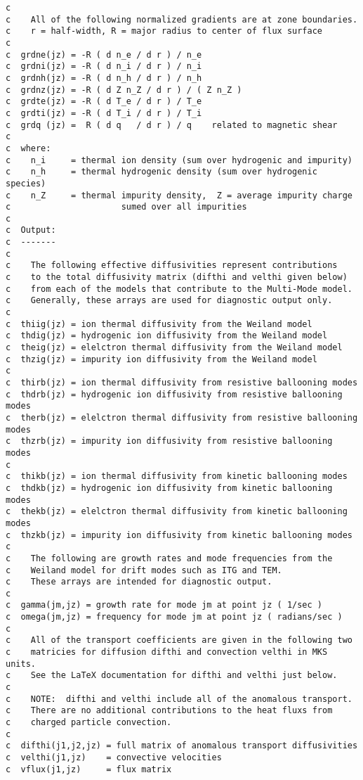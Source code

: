 \begin{verbatim}
c
c    All of the following normalized gradients are at zone boundaries.
c    r = half-width, R = major radius to center of flux surface
c
c  grdne(jz) = -R ( d n_e / d r ) / n_e
c  grdni(jz) = -R ( d n_i / d r ) / n_i
c  grdnh(jz) = -R ( d n_h / d r ) / n_h
c  grdnz(jz) = -R ( d Z n_Z / d r ) / ( Z n_Z )
c  grdte(jz) = -R ( d T_e / d r ) / T_e
c  grdti(jz) = -R ( d T_i / d r ) / T_i
c  grdq (jz) =  R ( d q   / d r ) / q    related to magnetic shear
c
c  where:
c    n_i     = thermal ion density (sum over hydrogenic and impurity)
c    n_h     = thermal hydrogenic density (sum over hydrogenic species)
c    n_Z     = thermal impurity density,  Z = average impurity charge
c                      sumed over all impurities
c
c  Output:
c  -------
c
c    The following effective diffusivities represent contributions
c    to the total diffusivity matrix (difthi and velthi given below)
c    from each of the models that contribute to the Multi-Mode model.
c    Generally, these arrays are used for diagnostic output only.
c
c  thiig(jz) = ion thermal diffusivity from the Weiland model
c  thdig(jz) = hydrogenic ion diffusivity from the Weiland model
c  theig(jz) = elelctron thermal diffusivity from the Weiland model
c  thzig(jz) = impurity ion diffusivity from the Weiland model
c	    
c  thirb(jz) = ion thermal diffusivity from resistive ballooning modes
c  thdrb(jz) = hydrogenic ion diffusivity from resistive ballooning modes
c  therb(jz) = elelctron thermal diffusivity from resistive ballooning modes
c  thzrb(jz) = impurity ion diffusivity from resistive ballooning modes
c	    
c  thikb(jz) = ion thermal diffusivity from kinetic ballooning modes
c  thdkb(jz) = hydrogenic ion diffusivity from kinetic ballooning modes
c  thekb(jz) = elelctron thermal diffusivity from kinetic ballooning modes
c  thzkb(jz) = impurity ion diffusivity from kinetic ballooning modes
c
c    The following are growth rates and mode frequencies from the
c    Weiland model for drift modes such as ITG and TEM.
c    These arrays are intended for diagnostic output.
c
c  gamma(jm,jz) = growth rate for mode jm at point jz ( 1/sec )
c  omega(jm,jz) = frequency for mode jm at point jz ( radians/sec )
c
c    All of the transport coefficients are given in the following two
c    matricies for diffusion difthi and convection velthi in MKS units.
c    See the LaTeX documentation for difthi and velthi just below.
c
c    NOTE:  difthi and velthi include all of the anomalous transport.
c    There are no additional contributions to the heat fluxs from
c    charged particle convection.
c
c  difthi(j1,j2,jz) = full matrix of anomalous transport diffusivities
c  velthi(j1,jz)    = convective velocities
c  vflux(j1,jz)     = flux matrix
\end{verbatim}

